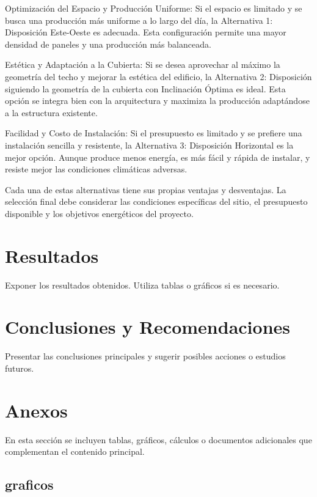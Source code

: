 \documentclass[a4paper,12pt]{article}
\begin{document}
\begin{Form}
Optimización del Espacio y Producción Uniforme: Si el espacio es limitado y se busca una producción más uniforme a lo largo del día, la Alternativa 1: Disposición Este-Oeste es adecuada. Esta configuración permite una mayor densidad de paneles y una producción más balanceada.

Estética y Adaptación a la Cubierta: Si se desea aprovechar al máximo la geometría del techo y mejorar la estética del edificio, la Alternativa 2: Disposición siguiendo la geometría de la cubierta con Inclinación Óptima es ideal. Esta opción se integra bien con la arquitectura y maximiza la producción adaptándose a la estructura existente.

Facilidad y Costo de Instalación: Si el presupuesto es limitado y se prefiere una instalación sencilla y resistente, la Alternativa 3: Disposición Horizontal es la mejor opción. Aunque produce menos energía, es más fácil y rápida de instalar, y resiste mejor las condiciones climáticas adversas.

Cada una de estas alternativas tiene sus propias ventajas y desventajas. La selección final debe considerar las condiciones específicas del sitio, el presupuesto disponible y los objetivos energéticos del proyecto.


\section{Resultados}
Exponer los resultados obtenidos. Utiliza tablas o gráficos si es necesario.

\section{Conclusiones y Recomendaciones}
Presentar las conclusiones principales y sugerir posibles acciones o estudios futuros.

\appendix
\section{Anexos}
En esta sección se incluyen tablas, gráficos, cálculos o documentos adicionales que complementan el contenido principal.


\subsection{graficos}

\misdatos


\end{Form}
\end{document}
